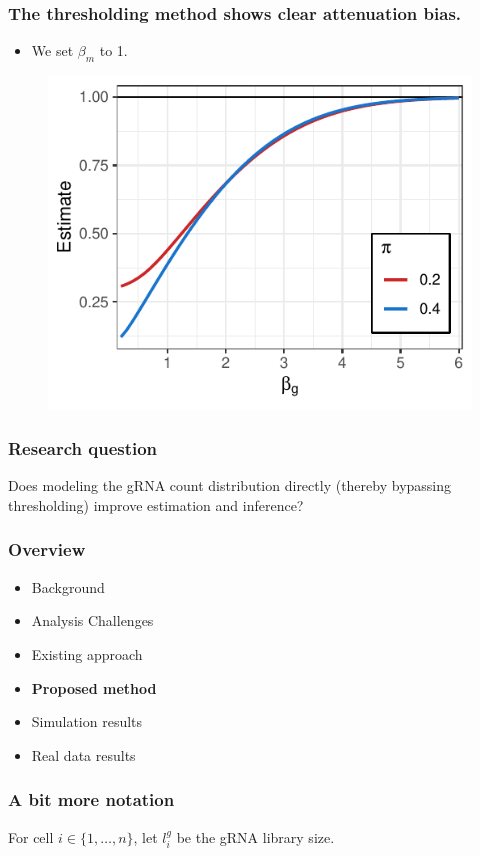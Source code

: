 \documentclass{beamer}
\begin{document}
\begin{frame}
\frametitle{The thresholding method shows clear attenuation bias.}
\begin{itemize}
\item We set $\beta_m$ to 1.
\end{itemize}

\begin{figure}
	\centering
	\includegraphics[width=0.75\linewidth]{../figures/fig2/att_bias}
\end{figure}


\end{frame}

\begin{frame}
\frametitle{Research question}
Does modeling the gRNA count distribution directly (thereby bypassing thresholding) improve estimation and inference?
\end{frame}


\begin{frame}
\frametitle{Overview}
\begin{itemize}
	\item Background
	\item Analysis Challenges
	\item Existing approach
	\item \textbf{Proposed method}
	\item Simulation results
	\item Real data results
\end{itemize}
\end{frame}


\begin{frame}
\frametitle{A bit more notation}
For cell $i \in \{ 1, \dots, n\}$, let $l^g_i$ be the gRNA library size.
\end{frame}
\end{document}
